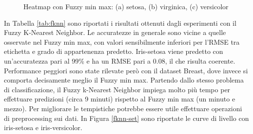 \documentclass[11pt,  oneside, openany]{book}
\begin{document}
\begin{figure}[h!]
		\centering
		\quad
		 \quad
		 \quad
		\caption{Heatmap con Fuzzy min max: (a) setosa, (b) virginica, (c) versicolor}
		\label{heatmapgfmm}
	\end{figure}	



In Tabella \ref{tab:fknn} sono riportati i risultati ottenuti dagli esperimenti con il Fuzzy K-Nearest Neighbor. 
Le accuratezze in generale sono vicine a quelle osservate nel Fuzzy min max, con valori sensibilmente inferiori per l'RMSE tra etichetta e grado di appartenenza predetto. Iris-setosa viene predetto con un'accuratezza pari al 99\% e ha un RMSE pari a 0.08, il che risulta coerente. Performance peggiori sono state rilevate però con il dataset Breast, dove invece si comporta decisamente meglio il Fuzzy min max. Partendo dallo stesso problema di classificazione, il Fuzzy k-Nearest Neighbor impiega molto più tempo per effettuare predizioni (circa 9 minuti) rispetto al Fuzzy min max (un minuto e mezzo). Per migliorare le tempistiche potrebbe essere utile effettuare operazioni di preprocessing sui dati. In Figura \ref{fknn-set} sono riportate le curve di livello con iris-setosa e iris-versicolor. 
\end{document}
